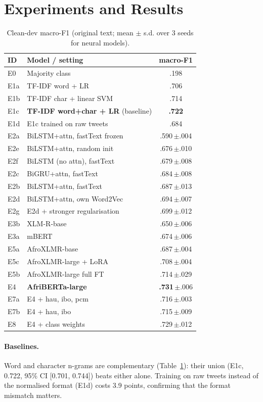 \documentclass[11pt]{article}
\newcommand{\pmstd}[1]{\,{\scriptsize$\pm$#1}}
\begin{document}
\section{Experiments and Results}
\begin{table}[t]
\centering\small
\setlength{\tabcolsep}{4pt}
\begin{tabular}{llc}
\toprule
ID & Model / setting & macro-F1 \\
\midrule
E0 & Majority class & .198 \\
E1a & TF-IDF word + LR & .706 \\
E1b & TF-IDF char + linear SVM & .714 \\
E1c & \textbf{TF-IDF word+char + LR} (baseline) & \textbf{.722} \\
E1d & E1c trained on raw tweets & .684 \\
\midrule
E2a & BiLSTM+attn, fastText frozen & .590\pmstd{.004} \\
E2e & BiLSTM+attn, random init & .676\pmstd{.010} \\
E2f & BiLSTM (no attn), fastText & .679\pmstd{.008} \\
E2c & BiGRU+attn, fastText & .684\pmstd{.008} \\
E2b & BiLSTM+attn, fastText & .687\pmstd{.013} \\
E2d & BiLSTM+attn, own Word2Vec & .694\pmstd{.007} \\
E2g & E2d + stronger regularisation & .699\pmstd{.012} \\
\midrule
E3b & XLM-R-base & .650\pmstd{.006} \\
E3a & mBERT & .674\pmstd{.006} \\
E5a & AfroXLMR-base & .687\pmstd{.004} \\
E5c & AfroXLMR-large + LoRA & .708\pmstd{.004} \\
E5b & AfroXLMR-large full FT & .714\pmstd{.029} \\
E4 & \textbf{AfriBERTa-large} & \textbf{.731}\pmstd{.006} \\
\midrule
E7a & E4 + hau, ibo, pcm & .716\pmstd{.003} \\
E7b & E4 + hau, ibo & .715\pmstd{.009} \\
E8 & E4 + class weights & .729\pmstd{.012} \\
\bottomrule
\end{tabular}
\caption{Clean-dev macro-F1 (original text; mean $\pm$ s.d. over 3 seeds for neural models).}
\label{tab:dev}
\end{table}

\paragraph{Baselines.} Word and character n-grams are complementary (Table~\ref{tab:dev}): their union (E1c, 0.722, 95\% CI [0.701, 0.744]) beats either alone. Training on raw tweets instead of the normalised format (E1d) costs 3.9 points, confirming that the format mismatch matters.
\end{document}
